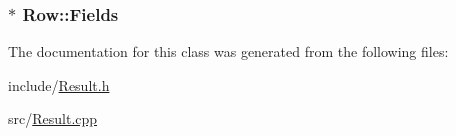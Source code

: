 \subsubsection[{Fields}]{$\ast$ Row\+::\+Fields\hspace{0.3cm}{\ttfamily [protected]}}\label{class_row_aaf5629269051fae24fbe8a4063d4375b}


The documentation for this class was generated from the following files\+:\begin{DoxyCompactItemize}
\item 
include/\hyperlink{_result_8h}{Result.\+h}\item 
src/\hyperlink{_result_8cpp}{Result.\+cpp}\end{DoxyCompactItemize}
